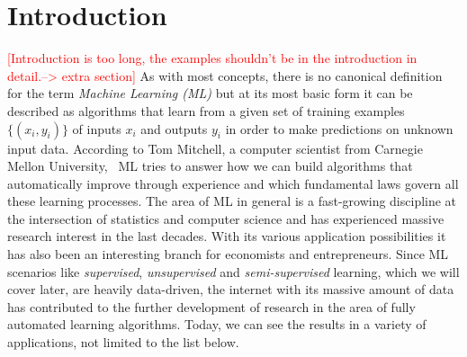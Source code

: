 \documentclass[conference]{IEEEtran}
\newcommand\notes[1]{\textcolor{red}{#1}}
\begin{document}
\section{Introduction}\label{sec:intro}
\notes{[Introduction is too long, the examples shouldn't be in the introduction in detail.--> extra section]}
As with most concepts, there is no canonical 
definition for the term \textit{Machine Learning (ML)} but at its most basic form it 
can be described as algorithms that learn from a given set of training examples 
$\{(x_i, y_i)\}$ of inputs $x_i$ and outputs $y_i$ in order to 
make predictions on unknown input data. According to Tom 
Mitchell, a computer scientist from Carnegie Mellon University,  ML tries 
to answer how we can build algorithms that automatically improve through 
experience and which fundamental laws govern all these learning processes\cite{ML:mitchell}.
The area of ML in general is a fast-growing discipline at the intersection of statistics 
and computer science and has experienced massive research interest in the last decades.
With its various application possibilities it has also been an interesting branch for 
economists and entrepreneurs.
Since ML scenarios like \textit{supervised}, \textit{unsupervised} and 
\textit{semi-supervised} learning, which we will cover later, are heavily data-driven, 
the internet with its massive amount of data has contributed to the further development 
of research in the area of fully automated learning algorithms. Today, we can see the 
results in a variety of applications\cite{FoundationsOfML:mohri}\cite{DisciplineOfML:mitchell}, 
not limited to the list below.
\end{document}
